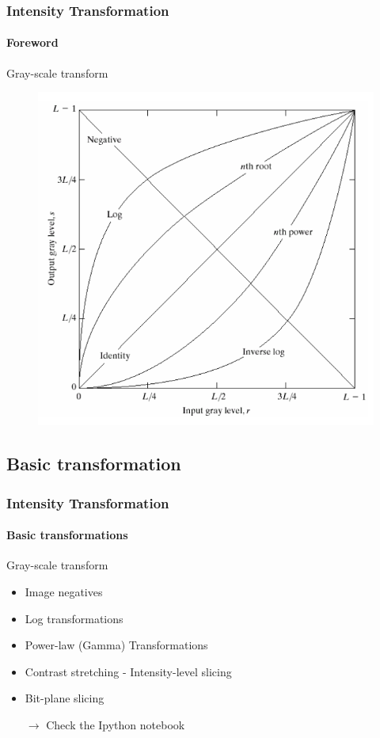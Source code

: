 \documentclass[table]{beamer}
\begin{document}
\begin{frame}
  \frametitle{Intensity Transformation}
  \framesubtitle{Foreword}
  \begin{block}{Gray-scale transform}\footnotesize
    \begin{figure}
      \centering
      \includegraphics[height=.6\textheight]{./images/gray_trans.png}
    \end{figure}
  \end{block}
\end{frame}

\subsection{Basic transformation}

\begin{frame}
  \frametitle{Intensity Transformation}
  \framesubtitle{Basic transformations}
  \begin{block}{Gray-scale transform}\footnotesize
    \begin{itemize}
    \item Image negatives
    \item Log transformations
    \item Power-law (Gamma) Transformations
    \item Contrast stretching - Intensity-level slicing
    \item Bit-plane slicing
    \item[$\rightarrow$] Check the Ipython notebook
    \end{itemize}
  \end{block}
\end{frame}
\end{document}
